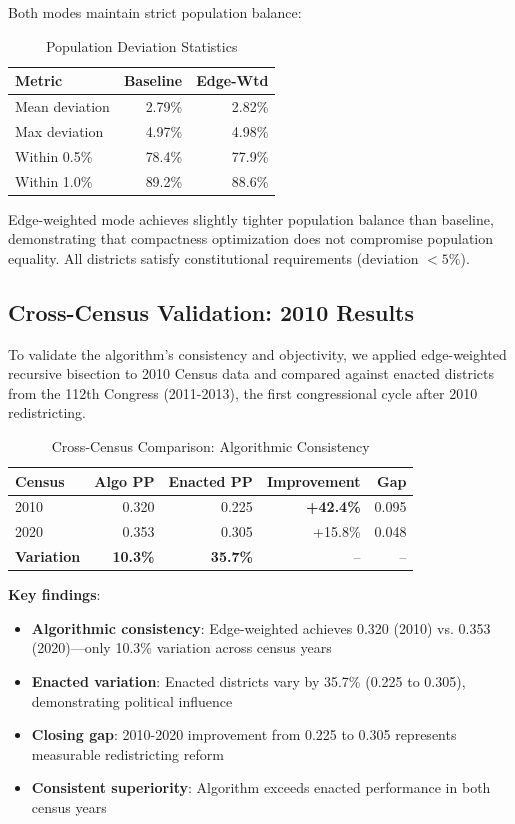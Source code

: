 Both modes maintain strict population balance:

\begin{table}[h]
\centering
\caption{Population Deviation Statistics}
\begin{tabular}{lrr}
\toprule
\textbf{Metric} & \textbf{Baseline} & \textbf{Edge-Wtd} \\
\midrule
Mean deviation & 2.79\% & 2.82\% \\
Max deviation & 4.97\% & 4.98\% \\
Within 0.5\% & 78.4\% & 77.9\% \\
Within 1.0\% & 89.2\% & 88.6\% \\
\bottomrule
\end{tabular}
\end{table}

Edge-weighted mode achieves slightly tighter population balance than baseline, demonstrating that compactness optimization does not compromise population equality. All districts satisfy constitutional requirements (deviation $< 5\%$).

\subsection{Cross-Census Validation: 2010 Results}

To validate the algorithm's consistency and objectivity, we applied edge-weighted recursive bisection to 2010 Census data and compared against enacted districts from the 112th Congress (2011-2013), the first congressional cycle after 2010 redistricting.

\begin{table}[h]
\centering
\caption{Cross-Census Comparison: Algorithmic Consistency}
\begin{tabular}{lrrrr}
\toprule
\textbf{Census} & \textbf{Algo PP} & \textbf{Enacted PP} & \textbf{Improvement} & \textbf{Gap} \\
\midrule
2010 & 0.320 & 0.225 & \textbf{+42.4\%} & 0.095 \\
2020 & 0.353 & 0.305 & +15.8\% & 0.048 \\
\midrule
\textbf{Variation} & \textbf{10.3\%} & \textbf{35.7\%} & -- & -- \\
\bottomrule
\end{tabular}
\end{table}

\textbf{Key findings}:

\begin{itemize}
\item \textbf{Algorithmic consistency}: Edge-weighted achieves 0.320 (2010) vs. 0.353 (2020)—only 10.3\% variation across census years
\item \textbf{Enacted variation}: Enacted districts vary by 35.7\% (0.225 to 0.305), demonstrating political influence
\item \textbf{Closing gap}: 2010-2020 improvement from 0.225 to 0.305 represents measurable redistricting reform
\item \textbf{Consistent superiority}: Algorithm exceeds enacted performance in both census years
\end{itemize}


